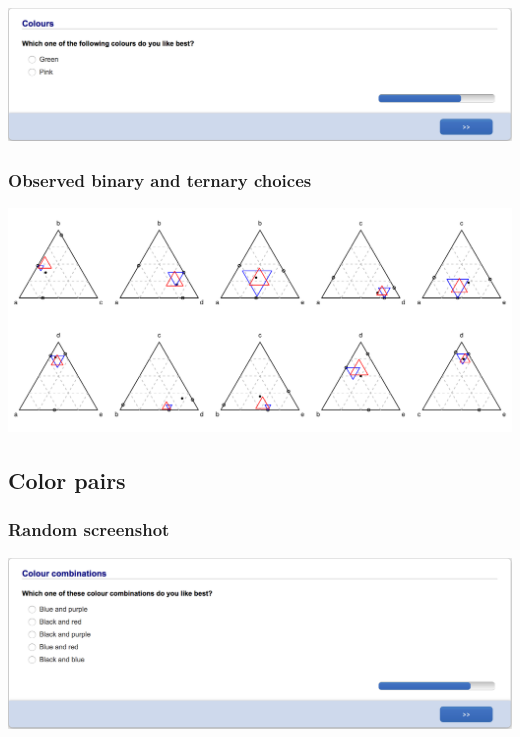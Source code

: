 \documentclass[11pt,letter]{article}
\begin{document}
\includegraphics[width=15cm]{Population_study_design/screenshot_colours.png}

\subsubsection*{Observed binary and ternary choices}

\includegraphics[width=15cm]{./Population_study_data/Simplexes/colours.pdf}

\pagebreak

\subsection*{Color pairs}



\subsubsection*{Random screenshot}

\includegraphics[width=15cm]{Population_study_design/screenshot_colour_pairs.png}
\end{document}
